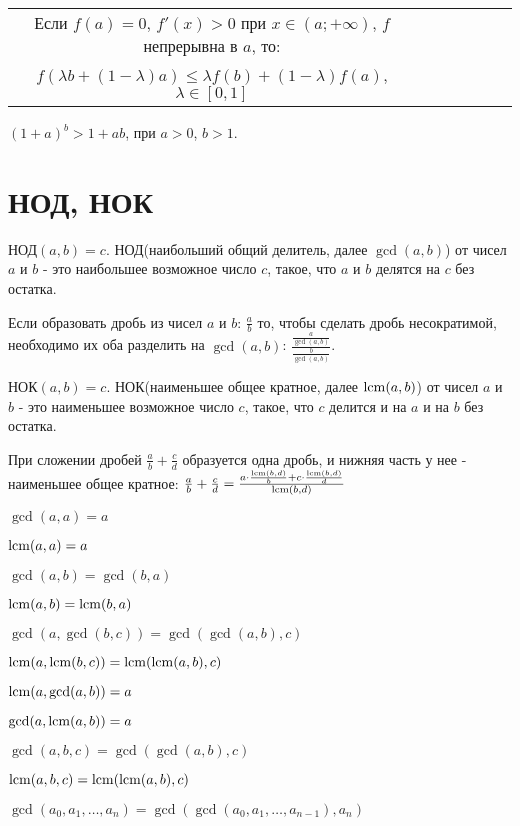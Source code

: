 \begin{tabu}[t]{ccccccc}
	Если $f(a) = 0$, $f'(x)>0$ при $x \in (a; +\infty)$, $f$ непрерывна в $a$, то: \\
	$f(\lambda b + (1-\lambda)a) \leqslant \lambda f(b) + (1-\lambda) f(a)$, $\lambda \in [0, 1]$
\end{tabu}

$ (1+a)^b > 1 + ab $, при $a > 0$, $ b > 1 $.


\section{НОД, НОК}

$ \text{НОД}(a, b) = c $. $\text{НОД}$(наибольший общий делитель, далее $\gcd(a, b)$) от чисел $a$ и $b$ - это наибольшее возможное число $c$, такое, что $a$ и $b$ делятся на $c$ без остатка.

Если образовать дробь из чисел $a$ и $b$: $\frac{a}{b}$ то, чтобы сделать дробь несократимой, необходимо их оба разделить на $ \gcd(a, b) $: $\frac{\frac{a}{\gcd(a, b)}}{\frac{b}{\gcd(a, b)}}$.

$ \text{НОК}(a, b) = c $. $\text{НОК}$(наименьшее общее кратное, далее $\operatorname{lcm}(a, b)$) от чисел $a$ и $b$ - это наименьшее возможное число $c$, такое, что $c$ делится и на $a$ и на $b$ без остатка.

При сложении дробей $\frac{a}{b} + \frac{c}{d}$ образуется одна дробь, и нижняя часть у нее - наименьшее общее кратное: $\frac{a}{b} + \frac{c}{d} = \frac{a\cdot \frac{\operatorname{lcm}(b, d)}{b} + c\cdot \frac{\operatorname{lcm}(b, d)}{d}}{\operatorname{lcm}(b, d)}$ 

$\gcd(a, a) = a$ 

$\operatorname{lcm}(a, a) = a$


$\gcd(a, b) = \gcd(b, a)$

$\operatorname{lcm}(a, b) = \operatorname{lcm}(b, a)$


$\gcd(a, \gcd(b, c)) = \gcd(\gcd(a, b), c)$

$\operatorname{lcm}(a, \operatorname{lcm}(b, c)) = \operatorname{lcm}(\operatorname{lcm}(a, b), c)$


$\operatorname{lcm}(a, \gcd(a, b)) = a$

$\gcd(a, \operatorname{lcm}(a, b)) = a$


$\gcd(a, b, c) = \gcd(\gcd(a, b), c)$

$\operatorname{lcm}(a, b, c) = \operatorname{lcm}(\operatorname{lcm}(a, b), c)$


$\gcd(a_0, a_1, \dots, a_n) = \gcd(\gcd(a_0, a_1, \dots, a_{n-1}), a_n)$

